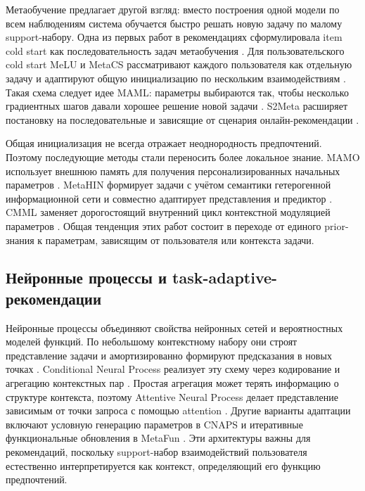 \documentclass[12pt,a4paper]{article}
\begin{document}
Метаобучение предлагает другой взгляд: вместо построения одной модели по всем
наблюдениям система обучается быстро решать новую задачу по малому support-набору.
Одна из первых работ в рекомендациях сформулировала item cold start как
последовательность задач метаобучения \citep{vartak2017itemcoldstart}. Для
пользовательского cold start MeLU и MetaCS рассматривают каждого пользователя
как отдельную задачу и адаптируют общую инициализацию по нескольким
взаимодействиям \citep{lee2019melu,bharadhwaj2019metacs}. Такая схема следует
идее MAML: параметры выбираются так, чтобы несколько градиентных шагов давали
хорошее решение новой задачи \citep{finn2017maml}. S2Meta расширяет постановку
на последовательные и зависящие от сценария онлайн-рекомендации
\citep{du2019s2meta}.

Общая инициализация не всегда отражает неоднородность предпочтений. Поэтому
последующие методы стали переносить более локальное знание. MAMO использует
внешнюю память для получения персонализированных начальных параметров
\citep{dong2020mamo}. MetaHIN формирует задачи с учётом семантики
гетерогенной информационной сети и совместно адаптирует представления и
предиктор \citep{lu2020metahin}. CMML заменяет дорогостоящий внутренний цикл
контекстной модуляцией параметров \citep{feng2021cmml}. Общая тенденция этих
работ состоит в переходе от единого prior-знания к параметрам, зависящим от
пользователя или контекста задачи.

\subsection{Нейронные процессы и task-adaptive-рекомендации}

Нейронные процессы объединяют свойства нейронных сетей и вероятностных
моделей функций. По небольшому контекстному набору они строят представление
задачи и амортизированно формируют предсказания в новых точках
\citep{garnelo2018neuralprocesses}. Conditional Neural Process реализует эту
схему через кодирование и агрегацию контекстных пар
\citep{garnelo2018cnp}. Простая агрегация может терять информацию о структуре
контекста, поэтому Attentive Neural Process делает представление зависимым от
точки запроса с помощью attention \citep{kim2019anp}. Другие варианты
адаптации включают условную генерацию параметров в CNAPS
\citep{requeima2019cnaps} и итеративные функциональные обновления в MetaFun
\citep{xu2020metafun}. Эти архитектуры важны для рекомендаций, поскольку
support-набор взаимодействий пользователя естественно интерпретируется как
контекст, определяющий его функцию предпочтений.
\end{document}
